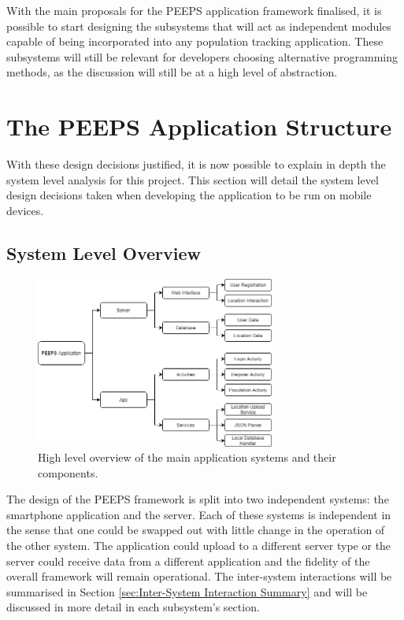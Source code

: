 With the main proposals for the PEEPS application framework finalised, it is possible to start designing the subsystems that will act as independent modules capable of being incorporated into any population tracking application. These subsystems will still be relevant for developers choosing alternative programming methods, as the discussion will still be at a high level of abstraction. 

\section{The PEEPS Application Structure}
With these design decisions justified, it is now possible to explain in depth the system level analysis for this project. This section will detail the system level design decisions taken when developing the application to be run on mobile devices.
\subsection{System Level Overview}

\begin{figure}[ht]
\centering
\includegraphics[width=0.7\textwidth]{figures/SystemHighLevel.png}
\caption{High level overview of the main application systems and their components.}
\label{fig:system_high_level}
\end{figure}

The design of the PEEPS framework is split into two independent systems: the smartphone application and the server. Each of these systems is independent in the sense that one could be swapped out with little change in the operation of the other system. The application could upload to a different server type or the server could receive data from a different application and the fidelity of the overall framework will remain operational. The inter-system interactions will be summarised in Section \ref{sec:Inter-System Interaction Summary} and will be discussed in more detail in each subsystem's section.

